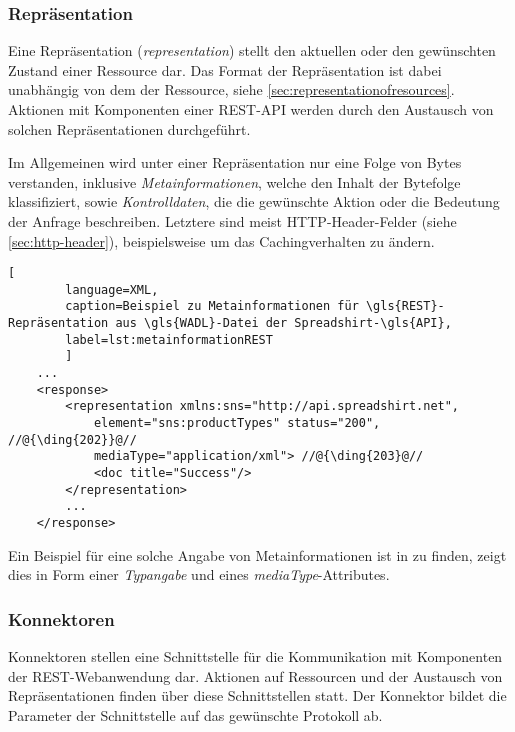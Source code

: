 \subsubsection{Repräsentation}
\label{sec:representation}

Eine Repräsentation (\emph{representation}) stellt den aktuellen oder den gewünschten Zustand einer Ressource dar. Das Format der Repräsentation ist dabei unabhängig von dem der Ressource, siehe \cref{sec:representationofresources}.
Aktionen mit Komponenten einer \gls{REST}-\gls{API} werden durch den Austausch von solchen Repräsentationen durchgeführt.

Im Allgemeinen wird unter einer Repräsentation nur eine Folge von Bytes verstanden, inklusive \emph{Metainformationen}, welche den Inhalt der Bytefolge klassifiziert, sowie \emph{Kontrolldaten}, die die gewünschte Aktion oder die Bedeutung der Anfrage beschreiben. Letztere sind meist \gls{HTTP}-Header-Felder (siehe \cref{sec:http-header}), beispielsweise um das Cachingverhalten zu ändern.

\begin{minipage}{\textwidth}
    \begin{lstlisting}[
        language=XML,
        caption=Beispiel zu Metainformationen für \gls{REST}-Repräsentation aus \gls{WADL}-Datei der Spreadshirt-\gls{API},
        label=lst:metainformationREST
        ]
    ...
    <response>
        <representation xmlns:sns="http://api.spreadshirt.net",
            element="sns:productTypes" status="200", //@{\ding{202}}@//
            mediaType="application/xml"> //@{\ding{203}@//
            <doc title="Success"/>
        </representation>
        ...
    </response>
    \end{lstlisting}
\end{minipage}

Ein Beispiel für eine solche Angabe von Metainformationen ist in  zu finden,  zeigt dies in Form einer \emph{Typangabe} und  eines \emph{mediaType}-Attributes.

\subsubsection{Konnektoren}

Konnektoren stellen eine Schnittstelle für die Kommunikation mit Komponenten der \gls{REST}-Webanwendung dar. Aktionen auf Ressourcen und der Austausch von Repräsentationen finden über diese Schnittstellen statt. Der Konnektor bildet die Parameter der Schnittstelle auf das gewünschte Protokoll ab.

